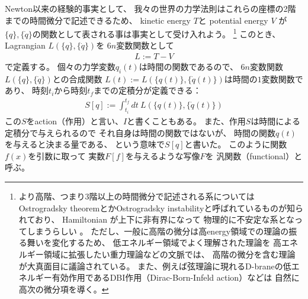Newton以来の経験的事実として、
我々の世界の力学法則はこれらの座標の2階までの時間微分で記述できるため、
kinetic energy $T$と
potential energy $V$
が
$\{q\}, \{\dot{q}\}$の関数として表される事は事実として受け入れよう。
\footnote{
  より高階、つまり3階以上の時間微分で記述される系については
  Ostrogradsky theoremとかOstrogradsky instabilityと呼ばれているものが知られており、
  Hamiltonian が上下に非有界になって
  物理的に不安定な系となってしまうらしい
  \cite{Ostrogradsky instability}。
  ただし、一般に高階の微分は高energy領域での理論の振る舞いを変化するため、
  低エネルギー領域でよく理解された理論を
  高エネルギー領域に拡張したい重力理論などの文脈では、
  高階の微分を含む理論が大真面目に議論されている。
  また、例えば弦理論に現れるD-braneの低エネルギー有効作用であるDBI作用（Dirac-Born-Infeld action）などは
  自然に高次の微分項を導く。
}
このとき、Lagrangian $L(\{q\}, \{\dot{q}\})$を
$6n$変数関数として
\begin{align}
  L := T - V
\end{align}
で定義する。
個々の力学変数$q_i(t)$は時間の関数であるので、
$6n$変数関数
$L(\{q\}, \{\dot{q}\})$との合成関数
$L(t) := L(\{q(t)\}, \{\dot{q}(t)\})$は時間の$1$変数関数であり、
時刻$t_i$から時刻$t_f$までの定積分が定義できる：
\begin{align}
  S[q] := \int_{t_i}^{t_f}dt\ L(\{q(t)\}, \{\dot{q}(t)\})
\end{align}
この$S$をaction（作用）と言い、$I$と書くこともある。
また、作用$S$は時間による定積分で与えられるので
それ自身は時間の関数ではないが、
時間の関数$q(t)$を与えると決まる量である、
という意味で$S[q]$と書いた。
このように関数$f(x)$を引数に取って
実数$F[f]$を与えるような写像$F$を
汎関数（functional）と呼ぶ。

